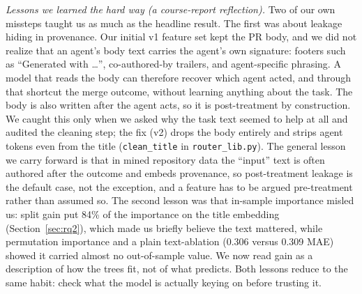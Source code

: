 \documentclass[sigconf,nonacm]{acmart}
\begin{document}
\emph{Lessons we learned the hard way (a course-report reflection).} Two of our own missteps taught us as much as the headline result. The first was about leakage hiding in provenance. Our initial v1 feature set kept the PR body, and we did not realize that an agent's body text carries the agent's own signature: footers such as ``Generated with \ldots'', co-authored-by trailers, and agent-specific phrasing. A model that reads the body can therefore recover which agent acted, and through that shortcut the merge outcome, without learning anything about the task. The body is also written after the agent acts, so it is post-treatment by construction. We caught this only when we asked why the task text seemed to help at all and audited the cleaning step; the fix (v2) drops the body entirely and strips agent tokens even from the title (\texttt{clean\_title} in \texttt{router\_lib.py}). The general lesson we carry forward is that in mined repository data the ``input'' text is often authored after the outcome and embeds provenance, so post-treatment leakage is the default case, not the exception, and a feature has to be argued pre-treatment rather than assumed so. The second lesson was that in-sample importance misled us: split gain put 84\% of the importance on the title embedding (Section~\ref{sec:rq2}), which made us briefly believe the text mattered, while permutation importance and a plain text-ablation (0.306 versus 0.309 MAE) showed it carried almost no out-of-sample value. We now read gain as a description of how the trees fit, not of what predicts. Both lessons reduce to the same habit: check what the model is actually keying on before trusting it.
\end{document}
